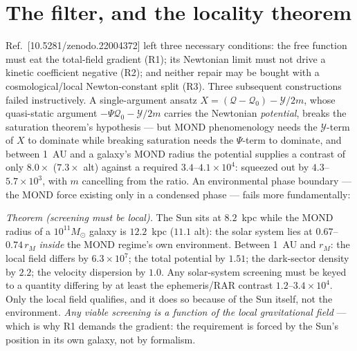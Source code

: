 \documentclass[aps,prd,twocolumn,10pt,nofootinbib,superscriptaddress]{revtex4-2}
\newcommand{\QQ}{\mathcal{Q}}
\newcommand{\YY}{\mathcal{Y}}
\begin{document}
\begin{abstract}
1~AU anomaly is $10^{-3458.7}\,\mathrm{m\,s^{-2}}$. There is no unit-timelike vector, so the
vector-ghost mechanism that killed the $Z$-form has no counterpart (R2), and no
$\tilde G/G_N$ split is forced (R3). \textbf{What is owed}, stated plainly: a nonlinear
Boulware--Deser ghost analysis --- BIMOND's connection-difference interaction is not of
Hassan--Rosen form, so the known exemption does not automatically apply --- and a Boltzmann
computation, since the previous host's $0.01\sigma$ CMB pass does not transfer even though the
dust component is identical. ``No computed kill'' is not ``proven viable,'' and we say which.
\end{abstract}

\maketitle

\section{The filter, and the locality theorem}

Ref.~[10.5281/zenodo.22004372] left three necessary conditions: the free function must eat the
total-field gradient (R1); its Newtonian limit must not drive a kinetic coefficient negative
(R2); and neither repair may be bought with a cosmological/local Newton-constant split (R3).
Three subsequent constructions failed instructively. A single-argument ansatz
$X=(\QQ-\QQ_0)-\YY/2m$, whose quasi-static argument $-\Psi\QQ_0-\YY/2m$ carries the Newtonian
\emph{potential}, breaks the saturation theorem's hypothesis --- but MOND phenomenology needs
the $\YY$-term of $X$ to dominate while breaking saturation needs the $\Psi$-term to dominate,
and between 1~AU and a galaxy's MOND radius the potential supplies a contrast of only
$8.0\times$ ($7.3\times$ alt) against a required $3.4$--$4.1\times10^{4}$: squeezed out by
$4.3$--$5.7\times10^{3}$, with $m$ cancelling from the ratio. An environmental phase boundary
--- the MOND force existing only in a condensed phase --- fails more fundamentally:

\emph{Theorem (screening must be local).} The Sun sits at $8.2$~kpc while the MOND radius of a
$10^{11}M_\odot$ galaxy is $12.2$~kpc ($11.1$ alt): the solar system lies at $0.67$--$0.74\,r_M$
\emph{inside} the MOND regime's own environment. Between 1~AU and $r_M$: the local field differs
by $6.3\times10^{7}$; the total potential by $1.51$; the dark-sector density by $2.2$; the
velocity dispersion by $1.0$. Any solar-system screening must be keyed to a quantity differing
by at least the ephemeris/RAR contrast $1.2$--$3.4\times10^{4}$. Only the local field qualifies,
and it does so because of the Sun itself, not the environment. \emph{Any viable screening is a
function of the local gravitational field} --- which is why R1 demands the gradient: the
requirement is forced by the Sun's position in its own galaxy, not by formalism.
\end{document}

